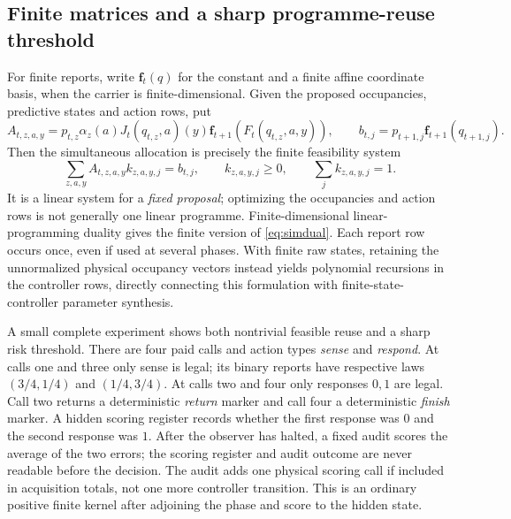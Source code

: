 \subsection{Finite matrices and a sharp programme-reuse threshold}
For finite reports, write $\mathbf f_t(q)$ for the constant and a finite affine coordinate basis, when the carrier is finite-dimensional. Given the proposed occupancies, predictive states and action rows, put
\[
 A_{t,z,a,y}=p_{t,z}\alpha_z(a)J_t(q_{t,z},a)(y)
              \mathbf f_{t+1}(F_t(q_{t,z},a,y)),\qquad
 b_{t,j}=p_{t+1,j}\mathbf f_{t+1}(q_{t+1,j}).
\]
Then the simultaneous allocation is precisely the finite feasibility system
\begin{equation}\label{eq:finite_matrix}
 \sum_{z,a,y}A_{t,z,a,y}k_{z,a,y,j}=b_{t,j},\qquad
 k_{z,a,y,j}\ge0,\qquad\sum_jk_{z,a,y,j}=1.
\end{equation}
It is a linear system for a \emph{fixed proposal}; optimizing the occupancies and action rows is not generally one linear programme. Finite-dimensional linear-programming duality gives the finite version of \eqref{eq:simdual}. Each report row occurs once, even if used at several phases. With finite raw states, retaining the unnormalized physical occupancy vectors instead yields polynomial recursions in the controller rows, directly connecting this formulation with finite-state-controller parameter synthesis\cite{junges}.

A small complete experiment shows both nontrivial feasible reuse and a sharp risk threshold. There are four paid calls and action types \emph{sense} and \emph{respond}. At calls one and three only sense is legal; its binary reports have respective laws $(3/4,1/4)$ and $(1/4,3/4)$. At calls two and four only responses $0,1$ are legal. Call two returns a deterministic \emph{return} marker and call four a deterministic \emph{finish} marker. A hidden scoring register records whether the first response was $0$ and the second response was $1$. After the observer has halted, a fixed audit scores the average of the two errors; the scoring register and audit outcome are never readable before the decision. The audit adds one physical scoring call if included in acquisition totals, not one more controller transition. This is an ordinary positive finite kernel after adjoining the phase and score to the hidden state.

